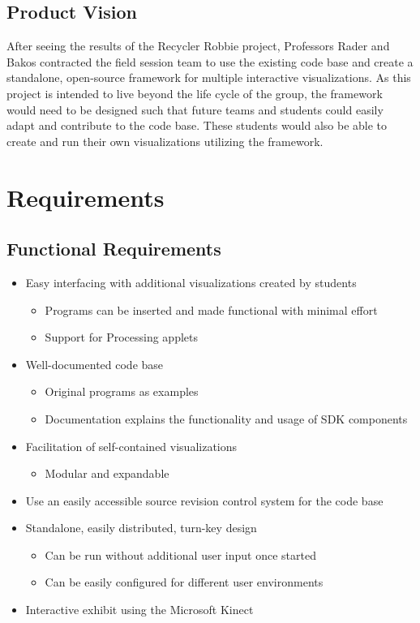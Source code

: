 \documentclass[11pt,letterpaper]{article}
\begin{document}
	\subsection{Product Vision}
  After seeing the results of the Recycler Robbie project, Professors Rader and
  Bakos contracted the field session team to use the existing code base and
  create a standalone, open-source framework for multiple interactive
  visualizations. As this project is intended to live beyond the life cycle of
  the group, the framework would need to be designed such that future teams and
  students could easily adapt and contribute to the code base. These students
  would also be able to create and run their own visualizations utilizing the
  framework. 
	\pagebreak
 
	\section{Requirements}
	\subsection{Functional Requirements}
	\begin{itemize}
		\item Easy interfacing with additional visualizations created by students
		\begin{itemize}
			\item Programs can be inserted and made functional with minimal effort
			\item Support for Processing applets
		\end{itemize}
		\item Well-documented code base
		\begin{itemize}
			\item Original programs as examples
			\item Documentation explains the functionality and usage of SDK components
		\end{itemize}
		\item Facilitation of self-contained visualizations
		\begin{itemize}
			\item Modular and expandable
		\end{itemize}
		\item Use an easily accessible source revision control system for the code base
		\item Standalone, easily distributed, turn-key design
		\begin{itemize}
			\item Can be run without additional user input once started
			\item Can be easily configured for different user environments
		\end{itemize}
		\item Interactive exhibit using the Microsoft Kinect
	\end{itemize}
\end{document}
